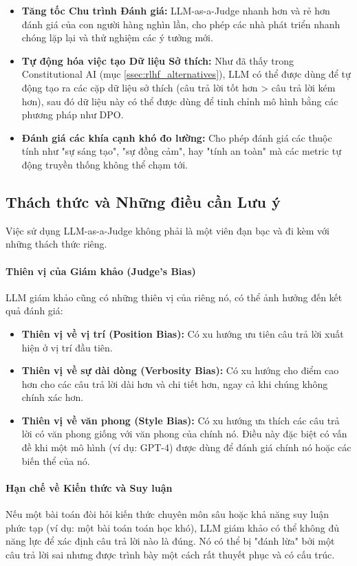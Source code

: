 \begin{itemize}
    \item \textbf{Tăng tốc Chu trình Đánh giá:} LLM-as-a-Judge nhanh hơn và rẻ hơn đánh giá của con người hàng nghìn lần, cho phép các nhà phát triển nhanh chóng lặp lại và thử nghiệm các ý tưởng mới.
    \item \textbf{Tự động hóa việc tạo Dữ liệu Sở thích:} Như đã thấy trong Constitutional AI (mục \ref{ssec:rlhf_alternatives}), LLM có thể được dùng để tự động tạo ra các cặp dữ liệu sở thích (câu trả lời tốt hơn > câu trả lời kém hơn), sau đó dữ liệu này có thể được dùng để tinh chỉnh mô hình bằng các phương pháp như DPO.
    \item \textbf{Đánh giá các khía cạnh khó đo lường:} Cho phép đánh giá các thuộc tính như "sự sáng tạo", "sự đồng cảm", hay "tính an toàn" mà các metric tự động truyền thống không thể chạm tới.
\end{itemize}

\subsection{Thách thức và Những điều cần Lưu ý}
\label{ssec:llm_judge_challenges}
Việc sử dụng LLM-as-a-Judge không phải là một viên đạn bạc và đi kèm với những thách thức riêng.

\paragraph{Thiên vị của Giám khảo (Judge's Bias)}
LLM giám khảo cũng có những thiên vị của riêng nó, có thể ảnh hưởng đến kết quả đánh giá:
\begin{itemize}
    \item \textbf{Thiên vị về vị trí (Position Bias):} Có xu hướng ưu tiên câu trả lời xuất hiện ở vị trí đầu tiên.
    \item \textbf{Thiên vị về sự dài dòng (Verbosity Bias):} Có xu hướng cho điểm cao hơn cho các câu trả lời dài hơn và chi tiết hơn, ngay cả khi chúng không chính xác hơn.
    \item \textbf{Thiên vị về văn phong (Style Bias):} Có xu hướng ưa thích các câu trả lời có văn phong giống với văn phong của chính nó. Điều này đặc biệt có vấn đề khi một mô hình (ví dụ: GPT-4) được dùng để đánh giá chính nó hoặc các biến thể của nó.
\end{itemize}

\paragraph{Hạn chế về Kiến thức và Suy luận}
Nếu một bài toán đòi hỏi kiến thức chuyên môn sâu hoặc khả năng suy luận phức tạp (ví dụ: một bài toán toán học khó), LLM giám khảo có thể không đủ năng lực để xác định câu trả lời nào là đúng. Nó có thể bị "đánh lừa" bởi một câu trả lời sai nhưng được trình bày một cách rất thuyết phục và có cấu trúc.

